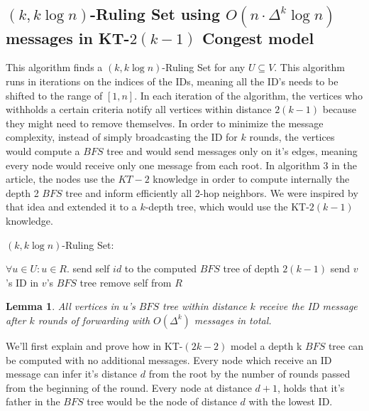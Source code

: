 \documentclass[11pt]{article}
\newtheorem{lemma}{Lemma}
\begin{document}
\subsection{\texorpdfstring{$(k, k\log{n})$-Ruling Set using $O(n\cdot\Delta^k\log{n})$ messages in KT-$2(k-1)$ Congest model}{}}

This algorithm finds a $(k, k\log{n})$-Ruling Set for any $U\subseteq V$. This algorithm runs in iterations on the indices of the IDs, meaning all the ID's needs to be shifted to the range of $[1,n]$. In each iteration of the algorithm, the vertices who withholds a certain criteria notify all vertices within distance $2(k-1)$ because they might need to remove themselves. In order to minimize the message complexity, instead of simply broadcasting the ID for $k$ rounds, the vertices would compute a $BFS$ tree and would send messages only on it's edges, meaning every node would receive only one message from each root. In algorithm 3 in the article, the nodes use the $KT-2$ knowledge in order to compute internally the depth 2 $BFS$ tree and inform efficiently all 2-hop neighbors. We were inspired by that idea and extended it to a $k$-depth tree, which would use the KT-$2(k-1)$ knowledge.

\begin{algorithm}
\caption{$(k, k\log{n})$-Ruling Set:}
\begin{algorithmic}[1]
\State $\forall u\in U: u\in R$.
        \State send self $id$ to the computed $BFS$ tree of depth $2(k-1)$
    \EndIf
        \State send $v$'s ID in $v$'s $BFS$ tree
            \State remove self from $R$
        \EndIf
    \EndIf
\EndFor
\end{algorithmic}
\end{algorithm}


\begin{lemma}
\label{bfs_tree}
All vertices in $u$'s $BFS$ tree within distance $k$ receive the ID message after $k$ rounds of forwarding with $O(\Delta^k)$ messages in total. 
\end{lemma}
We'll first explain and prove how in KT-$(2k-2)$ model a depth k $BFS$ tree can be computed with no additional messages.
Every node which receive an ID message can infer it's distance $d$ from the root by the number of rounds passed from the beginning of the round. Every node at distance $d+1$, holds that it's father in the $BFS$ tree would be the node of distance $d$ with the lowest ID.
\end{document}
